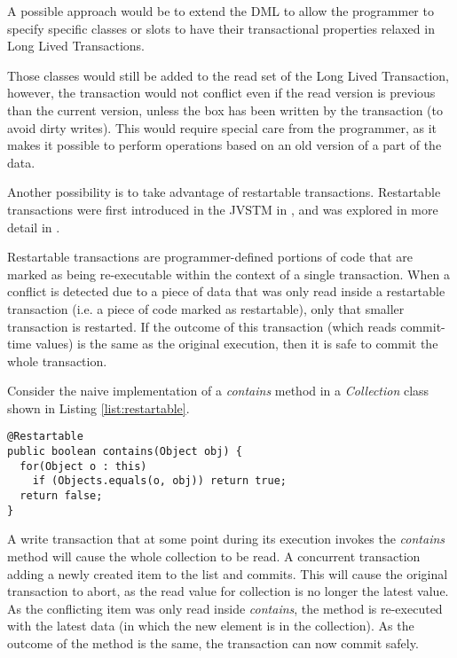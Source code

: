 A possible approach would be to extend the DML to allow the programmer
to specify specific classes or slots to have their transactional
properties relaxed in Long Lived Transactions.

Those classes would still be added to the read set of the Long Lived
Transaction, however, the transaction would not conflict even if the
read version is previous than the current version, unless the box has
been written by the transaction (to avoid dirty writes). This would
require special care from the programmer, as it makes it possible to
perform operations based on an old version of a part of the data.

Another possibility is to take advantage of restartable
transactions. Restartable transactions were first introduced in the
JVSTM in \cite{cachopo2006versioned}, and was explored in more detail
in \cite{BrunoJorgeGasparFranco2013}.

Restartable transactions are programmer-defined portions of code that
are marked as being re-executable within the context of a single
transaction. When a conflict is detected due to a piece of data that
was only read inside a restartable transaction (i.e. a piece of code
marked as restartable), only that smaller transaction is restarted. If
the outcome of this transaction (which reads commit-time values) is
the same as the original execution, then it is safe to commit the
whole transaction.

Consider the naive implementation of a {\it contains} method in a {\it
  Collection} class shown in Listing \ref{list:restartable}.

\begin{lstlisting}[caption={Restartable {\it contains} method},
  label={list:restartable}]
@Restartable
public boolean contains(Object obj) {
  for(Object o : this)
    if (Objects.equals(o, obj)) return true;
  return false;
}
\end{lstlisting}

A write transaction that at some point during its execution invokes
the {\it contains} method will cause the whole collection to be read.
A concurrent transaction adding a newly created item to the list and
commits. This will cause the original transaction to abort, as the
read value for collection is no longer the latest value.  As the
conflicting item was only read inside {\it contains}, the method is
re-executed with the latest data (in which the new element is in the
collection). As the outcome of the method is the same, the transaction
can now commit safely.

